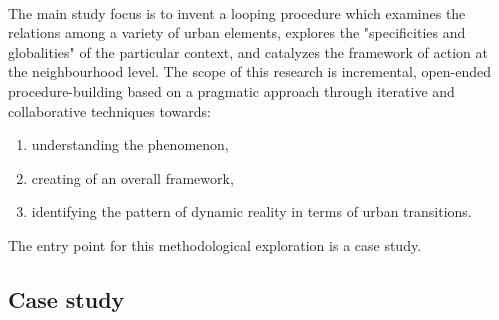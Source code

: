 \documentclass[11pt]{report}
\begin{document}
\\
The main study focus is to invent a looping procedure which examines the relations among a variety of urban elements, explores the "specificities and globalities" of the particular context, and catalyzes the framework of action at the neighbourhood level. The scope of this research is incremental, open-ended procedure-building based on a pragmatic approach through iterative and collaborative techniques towards:
\begin{enumerate}
\item understanding the phenomenon,
\item creating of an overall framework,
\item identifying the pattern of dynamic reality in terms of urban transitions. 
\end{enumerate} 
The entry point for this methodological exploration is a case study.

\subsection{Case study}
\end{document}
